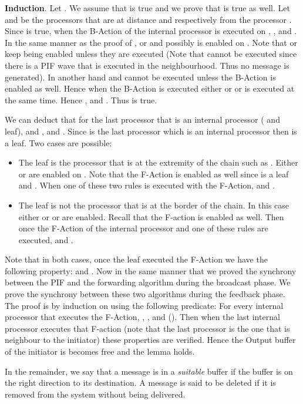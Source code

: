 \documentclass{llncs}
\renewenvironment{proof}{{\it Proof. } }{{\hfill }\vspace{.5pc}}
\begin{document}
\begin{proof}
\textbf{Induction}. Let   . We assume that  is true and we prove that  is true as well. Let  and  be the processors that are at distance  and  respectively from the processor . Since  is true, when the B-Action of the internal processor is executed on , ,  and . In the same manner as the proof of ,  or  and possibly  is enabled on . Note that  or  keep being enabled unless they are executed (Note that  cannot be executed since there is a PIF wave that is executed in the neighbourhood. Thus no message is generated). In another hand  and  cannot be executed unless the B-Action is enabled as well. Hence when the B-Action is executed either  or  or  is executed at the same time. Hence ,  and . Thus  is true. 

We can deduct that for the last processor  that is an internal processor ( and  leaf),  and ,  and  . Since  is the last processor which is an internal processor then  is a leaf. Two cases are possible:
\begin{itemize}
\item{The leaf is the processor  that is at the extremity of the chain such as . Either  or  are enabled on . Note that the F-Action is enabled as well since  is a leaf and . When one of these two rules is executed with the F-Action,  and .}
\item{The leaf  is not the processor that is at the border of the chain.} In this case either  or  or  are enabled. Recall that the F-action is enabled as well. Then once the F-Action of the internal processor and one of these rules are executed,  and .
\end{itemize}

Note that in both cases, once the leaf  executed the F-Action we have the following property:  and . Now in the same manner that we proved the synchrony between the PIF and the forwarding algorithm during the broadcast phase. We prove the synchrony between these two algorithms during the feedback phase. The proof is by induction on  using the following predicate: For every internal processor  that executes the F-Action, , ,  and  (). Then when the last internal processor executes that F-action (note that the last processor is the one that is neighbour to the initiator) these properties are verified. Hence the Output buffer of the initiator is becomes free and the lemma holds.

\end{proof}

In the remainder, we say that a message is in a {\em suitable} buffer if the buffer is on the right direction to its
destination.  
A message is said to be deleted if it is removed from the system without being delivered.
\end{document}
